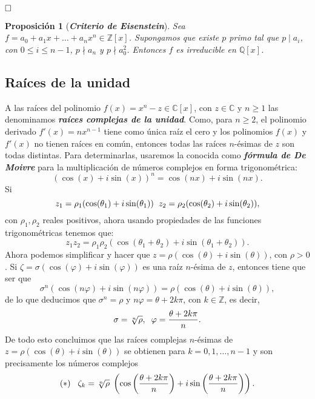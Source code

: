 \documentclass[12pt]{article}
\newtheorem{proposition}[theorem]{Proposición}
\begin{document}
$\hfill \square$

\begin{proposition}[\textbf{\textit{Criterio de Eisenstein}}] Sea $f= a_{0} + a_{1}x + \ldots + a_{n}x^{n} \in \mathbb{Z}[x]$. Supongamos que existe $p$ primo tal que $p \mid a_{i}$, con $0 \leq i \leq n-1$, $p \nmid a_{n}$ y $p \nmid a_{0}^{2}$. Entonces $f$ es irreducible en $\mathbb{Q}[x]$.
\end{proposition} 


\subsection{Raíces de la unidad} \label{eq:raicesUnidad}

A las raíces del polinomio $f(x) = x^{n}-z \in \mathbb{C}[x]$, con $z \in \mathbb{C}$ y $n \geq 1$ las denominamos \textbf{\textit{raíces complejas de la unidad}}. Como, para $n \geq 2$, el polinomio derivado $f'(x) = nx^{n-1}$ tiene como única raíz el cero y los polinomios $f(x)$ y $f'(x)$ no tienen raíces en común, entonces todas las raíces $n$-ésimas de $z$ son todas distintas. Para determinarlas, usaremos la conocida como \textbf{\textit{fórmula de De Moivre}} para la multiplicación de números complejos en forma trigonométrica: $$(\cos(x) + i\sin(x))^{n} = \cos(nx) + i\sin(nx).$$ Si $$z_{1} = \rho_{1}(\cos (\theta_{1}) +i\sin (\theta_{1})) \hspace{0.2cm}z_{2} = \rho_{2}(\cos (\theta_{2}) +i\sin (\theta_{2})),$$ con $\rho_{1}, \rho_{2}$ reales positivos, ahora usando propiedades de las funciones trigonométricas tenemos que:
$$z_{1}z_{2} = \rho_{1}\rho_{2}(\cos(\theta_{1} + \theta_{2}) + i \sin(\theta_{1} + \theta_{2})).$$ Ahora podemos simplificar y hacer que $z = \rho (\cos(\theta) + i\sin(\theta))$, con $\rho > 0$. Si $\zeta = \sigma (\cos(\varphi) + i\sin(\varphi)) $ es una raíz $n$-ésima de $z$, entonces tiene que ser que $$\sigma^{n}(\cos(n\varphi) + i\sin(n\varphi)) = \rho (\cos(\theta)+ i\sin(\theta)),$$ de lo que deducimos que $\sigma^{n} = \rho$ y $n\varphi = \theta +2k\pi$, con $k \in \mathbb{Z}$, es decir, $$\sigma = \sqrt[n]{\rho}, \hspace{0.2cm} \varphi = \dfrac{\theta+2k\pi}{n}.$$
De todo esto concluimos que las raíces complejas $n$-ésimas de $z = \rho(\cos(\theta) + i\sin(\theta))$ se obtienen para $k = 0, 1, \ldots, n-1$ y son precisamente los números complejos $$ (\ast) \hspace{0.3cm}\zeta_{k} = \sqrt[n]{\rho} \hspace{0.1cm}\left(\cos\left(\dfrac{\theta+2k\pi}{n}\right) + i\sin\left(\dfrac{\theta+2k\pi}{n}\right)\right).$$
\end{document}
